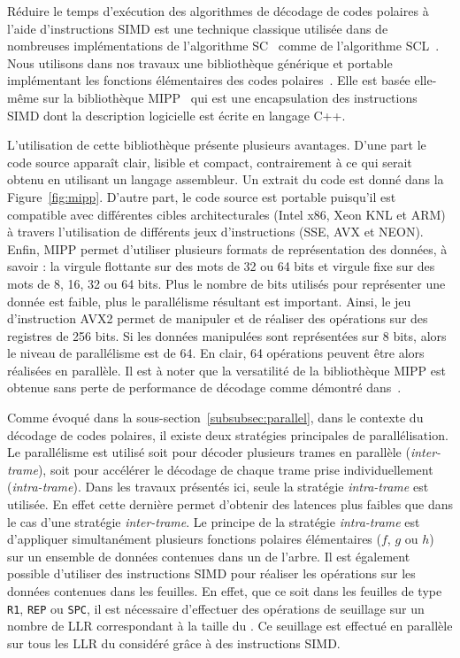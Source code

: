 Réduire le temps d'exécution des algorithmes de décodage de codes polaires à l'aide d'instructions SIMD est une technique classique utilisée dans de nombreuses implémentations de l'algorithme SC~\cite{sarkis_fast_2014,giard_fast_2014,giard_low-latency_2016,sarkis_autogenerating_2014,gal_software_2014,cassagne_efficient_2015,cassagne_energy_2016,gal_multi-gb/s_2015} comme de l'algorithme SCL~\cite{sarkis_fast_2016,sarkis_increasing_2014,shen_low-latency_2016}. Nous utilisons dans nos travaux une bibliothèque générique et portable implémentant les fonctions élémentaires des codes polaires~\cite{cassagne_efficient_2015}. Elle est basée elle-même sur la bibliothèque MIPP~\cite{cassagne2018mipp} qui est une encapsulation des instructions SIMD dont la description logicielle est écrite en langage C++.

L'utilisation de cette bibliothèque présente plusieurs avantages. D'une part le code source apparaît clair, lisible et compact, contrairement à ce qui serait obtenu en utilisant un langage assembleur. Un extrait du code est donné dans la Figure~\ref{fig:mipp}. D'autre part, le code source est portable puisqu'il est compatible avec différentes cibles architecturales (Intel x86, Xeon KNL et ARM) à travers l'utilisation de différents jeux d'instructions (SSE, AVX et NEON). Enfin, MIPP permet d'utiliser plusieurs formats de représentation des données, à savoir : la virgule flottante sur des mots de 32 ou 64 bits et virgule fixe sur des mots de 8, 16, 32 ou 64 bits. Plus le nombre de bits utilisés pour représenter une donnée est faible, plus le parallélisme résultant est important. Ainsi, le jeu d'instruction AVX2 permet de manipuler et de réaliser des opérations sur des registres de 256 bits. Si les données manipulées sont représentées sur 8 bits, alors le niveau de parallélisme est de 64. En clair, 64 opérations peuvent être alors réalisées en parallèle. Il est à noter que la versatilité de la bibliothèque MIPP est obtenue sans perte de performance de décodage comme démontré dans~\cite{cassagne2018mipp}.

Comme évoqué dans la sous-section~\ref{subsubsec:parallel}, dans le contexte du décodage de codes polaires, il existe deux stratégies principales de parallélisation. Le parallélisme est utilisé soit pour décoder plusieurs trames en parallèle (\textit{inter-trame}), soit pour accélérer le décodage de chaque trame prise individuellement (\textit{intra-trame}). Dans les travaux présentés ici, seule la stratégie \textit{intra-trame} est utilisée. En effet cette dernière permet d'obtenir des latences plus faibles que dans le cas d'une stratégie \textit{inter-trame}. Le principe de la stratégie \textit{intra-trame} est d'appliquer simultanément plusieurs fonctions polaires élémentaires ($f$, $g$ ou $h$) sur un ensemble de données contenues dans un \noeud de l'arbre. Il est également possible d'utiliser des instructions SIMD pour réaliser les opérations sur les données contenues dans les feuilles. En effet, que ce soit dans les feuilles de type \texttt{R1}, \texttt{REP} ou \texttt{SPC}, il est nécessaire d'effectuer des opérations de seuillage sur un nombre de LLR correspondant à la taille du \noeud. Ce seuillage est effectué en parallèle sur tous les LLR du \noeud considéré grâce à des instructions SIMD.

